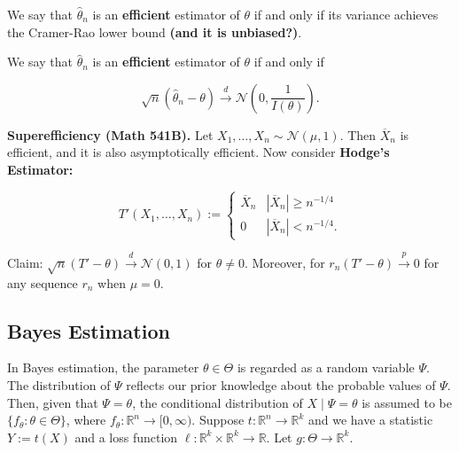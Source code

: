 \begin{definition}

We say that \(\hat{\theta}_n\) is an \textbf{efficient} estimator of \(\theta\) if and only if its variance achieves the Cramer-Rao lower bound \textbf{(and it is unbiased?)}. 

\end{definition}

\begin{definition}

We say that \(\hat{\theta}_n\) is an \textbf{efficient} estimator of \(\theta\) if and only if

\[
\sqrt{n}( \hat{\theta}_n - \theta) \xrightarrow{d} \mathcal{N} \left(0, \frac{1}{I(\theta)}\right).
\]

\end{definition}

\textbf{Superefficiency (Math 541B).} Let \(X_1, \ldots, X_n \sim \mathcal{N}(\mu, 1)\). Then \(\overline{X}_n\) is efficient, and it is also asymptotically efficient. Now consider \textbf{Hodge's Estimator:}

\[
T'(X_1, \ldots, X_n) := \begin{cases}
\overline{X}_n & | \overline{X}_n | \geq n^{-1/4} \\
0 & |\overline{X}_n | < n^{-1/4}.
\end{cases}
\]

Claim: \(\sqrt{n}(T' - \theta) \xrightarrow{d} \mathcal{N}(0,1)\) for \(\theta \neq 0\). Moreover, for \(r_n(T' - \theta) \xrightarrow{p} 0\) for any sequence \(r_n\) when \(\mu = 0\).

\subsection{Bayes Estimation}

In Bayes estimation, the parameter \(\theta \in \Theta\) is regarded as a random variable \(\Psi\). The distribution of \(\Psi\) reflects our prior knowledge about the probable values of \(\Psi\). Then, given that \(\Psi = \theta\), the conditional distribution of \(X \mid \Psi= \theta\) is assumed to be \(\{f_\theta: \theta \in \Theta \}\), where \(f_\theta: \mathbb{R}^n \to [0, \infty)\). Suppose \(t: \mathbb{R}^n \to \mathbb{R}^k\) and we have a statistic \(Y := t(X)\) and a loss function \(\ell: \mathbb{R}^k \times \mathbb{R}^k \to \mathbb{R}\). Let \(g: \Theta \to \mathbb{R}^k\).

